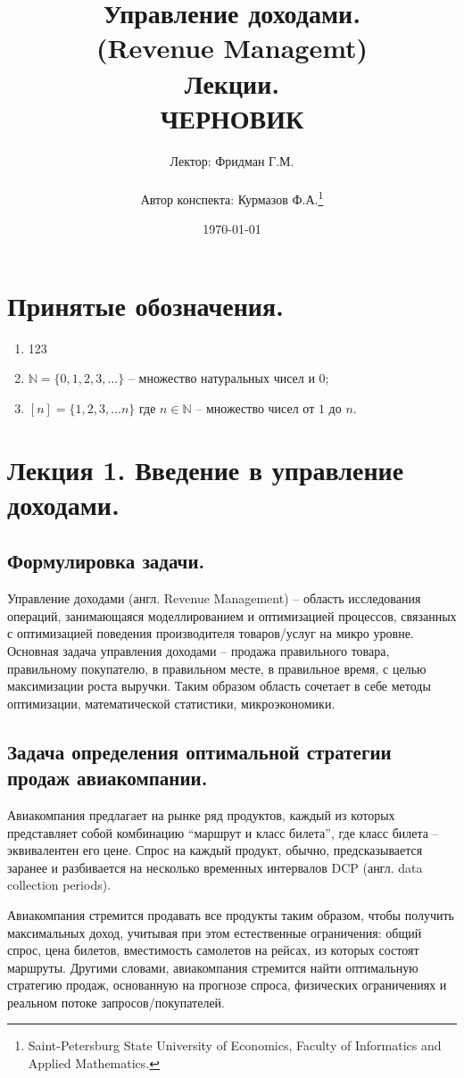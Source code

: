 \documentclass[reqno]{article}
\title{Управление доходами.\\ (Revenue Managemt)\\ Лекции.\\ ЧЕРНОВИК}
\author{Лектор: Фридман Г.М.\\  \\ Автор конспекта: Курмазов Ф.А.\thanks{Saint-Petersburg State University of Economics, Faculty of Informatics and Applied Mathematics.}}
\date{\today}
\theoremstyle{definition}
\theoremstyle{definition}
\theoremstyle{definition}
\theoremstyle{definition}
\theoremstyle{definition}
\theoremstyle{definition}
\theoremstyle{definition}
\theoremstyle{definition}
\theoremstyle{definition}
\begin{document}
	\maketitle

	\tableofcontents

	
	\newpage
	\section{Принятые обозначения.}

		\begin{enumerate}
			\item 123
			\item $\mathds{N} = \{0, 1, 2, 3, ...\}$ -- множество натуральных чисел и $0$;
			\item $[n] = \{1, 2, 3, ... n\}$ где $n \in \mathds{N}$ -- множество чисел от $1$ до $n$.
		\end{enumerate}

	\newpage
	\section{Лекция 1. Введение в управление доходами.}
		\subsection{Формулировка задачи.}
			
		Управление доходами (англ. Revenue Management) -- область исследования операций, занимающаяся моделлированием и оптимизацией процессов, связанных с оптимизацией поведения производителя товаров/услуг на микро уровне. Основная задача управления доходами -- продажа правильного товара, правильному покупателю, в правильном месте, в правильное время, с целью максимизации роста выручки. Таким образом область сочетает в себе методы оптимизации, математической статистики, микроэкономики.
		
		\subsection{Задача определения оптимальной стратегии продаж авиакомпании.}
			Авиакомпания предлагает на рынке ряд продуктов, каждый из которых представляет собой комбинацию ``маршрут и класс билета'', где класс билета -- эквивалентен его цене. Спрос на каждый продукт, обычно, предсказывается заранее и разбивается на несколько временных интервалов DCP (англ. data collection periods).
			
			Авиакомпания стремится продавать все продукты таким образом, чтобы получить максимальных доход, учитывая при этом естественные ограничения: общий спрос, цена билетов, вместимость самолетов на рейсах, из которых состоят маршруты. Другими словами, авиакомпания стремится найти оптимальную стратегию продаж, основанную на прогнозе спроса, физических ограничениях и реальном потоке запросов/покупателей.
		
\end{document}
